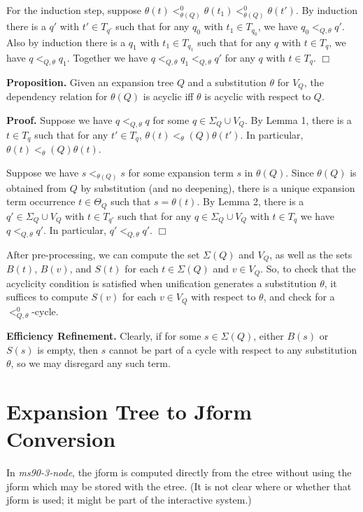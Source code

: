 For the induction step, suppose $\theta(t) <^0_{\theta(Q)} \theta(t_1) <^0_{\theta(Q)} \theta(t')$.
By induction there is a $q'$ with $t'\in T_{q'}$ such that for any $q_0$ with $t_1\in T_{q_0}$,
we have $q_0 <_{Q,\theta} q'$.
Also by induction there is a $q_1$ with $t_1\in T_{q_1}$ such that for any $q$ with $t\in T_q$,
we have $q <_{Q,\theta} q_1$.
Together we have $q <_{Q,\theta} q_1 <_{Q,\theta} q'$ for any $q$ with $t\in T_q$. $\Box$

{\bf Proposition.}  Given an expansion tree $Q$ and a substitution $\theta$ for $V_Q$,
the dependency relation for $\theta(Q)$ is acyclic iff $\theta$ is acyclic with respect to $Q$.

{\bf Proof.}  Suppose we have $q <_{Q,\theta} q$ for some $q\in \Sigma_Q \cup V_Q$.
By Lemma 1, there is a $t\in T_q$ such that for any $t'\in T_q$, $\theta(t) <_\theta(Q) \theta(t')$.
In particular, $\theta(t) <_\theta(Q) \theta(t)$.

Suppose we have $s <_{\theta(Q)} s$ for some expansion term $s$ in $\theta(Q)$.
Since $\theta(Q)$ is obtained from $Q$ by substitution (and no deepening), there
is a unique expansion term occurrence $t\in \Theta_Q$ such that $s = \theta(t)$.
By Lemma 2, there is a $q'\in \Sigma_Q \cup V_Q$ with $t\in T_{q'}$ such that for 
any $q\in \Sigma_Q \cup V_Q$ with $t\in T_q$ we have $q <_{Q,\theta} q'$.
In particular, $q' <_{Q,\theta} q'$. $\Box$

After pre-processing, we can compute the set $\Sigma(Q)$ and $V_Q$, as well as
the sets $B(t)$, $B(v)$, and $S(t)$ for each $t\in\Sigma(Q)$ and $v\in V_Q$.
So, to check that the
acyclicity condition is satisfied when unification generates
a substitution $\theta$, it suffices to compute $S(v)$ for each $v\in V_Q$
with respect to $\theta$, and check for a $<^0_{Q,\theta}$-cycle. 

{\bf Efficiency Refinement.}  Clearly, if for some $s\in \Sigma(Q)$, either $B(s)$ or
$S(s)$ is empty, then $s$ cannot be part of a cycle with respect to any substitution
$\theta$, so we may disregard any such term.

\section{Expansion Tree to Jform Conversion}\label{etree-to-jform}
In {\it ms90-3-node}, the jform is computed directly from the etree without using 
the jform which may be stored with the etree. (It is not clear where or whether
that jform is used; it might be part of the interactive system.)

